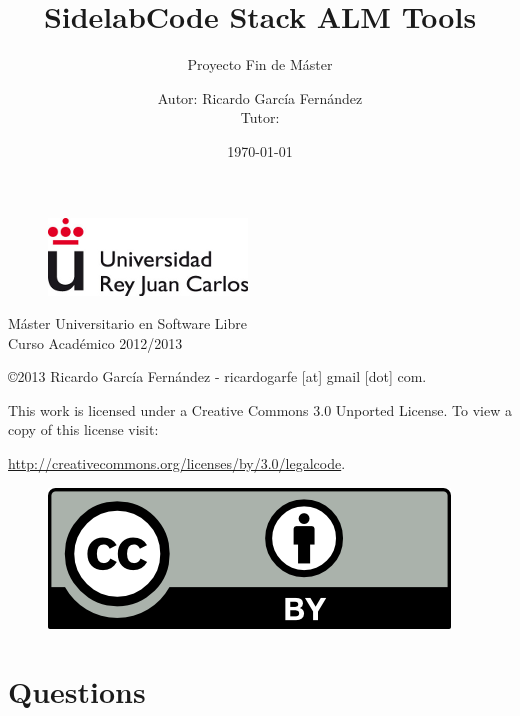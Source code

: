 \documentclass[11pt]{scrartcl}
\title{\textbf{SidelabCode Stack ALM Tools}}
\subtitle{Proyecto Fin de M\'aster}
\author{Autor: Ricardo Garc\'ia Fern\'andez
\\Tutor: }
\date{\today}
\begin{document}
\maketitle

\begin{figure}[h]
    \begin{center}
        \includegraphics{urjc}
        \label{fig:by}
    \end{center}
\end{figure}

\vspace{4cm}

\begin{center}
\large
M\'aster Universitario en Software Libre
\\Curso Acad\'emico 2012/2013
\end{center}

\vfill

\begin{flushright}
    \copyright  2013 Ricardo Garc\'ia Fern\'andez - ricardogarfe [at] gmail [dot] com.

    This work is licensed under a Creative Commons 3.0 Unported License.
    To view a copy of this license visit:
 
    \url{http://creativecommons.org/licenses/by/3.0/legalcode}.
\end{flushright}

\begin{figure}[h]
    \begin{flushright}	
        \includegraphics{by}
        \label{fig:by}
    \end{flushright}
\end{figure}

\newpage

\section{Questions}
\end{document}
